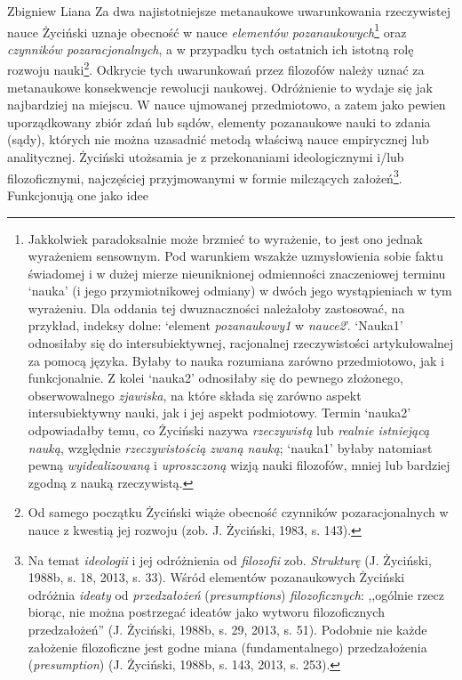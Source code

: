 \begin{artplenv}{Zbigniew Liana}
Za dwa najistotniejsze metanaukowe uwarunkowania rzeczywistej nauce Życiński uznaje obecność w nauce \textit{elementów
pozanaukowych}\footnote{Jakkolwiek paradoksalnie może brzmieć to wyrażenie, to jest ono jednak wyrażeniem sensownym.
Pod warunkiem wszakże uzmysłowienia sobie faktu świadomej i w dużej mierze nieuniknionej odmienności znaczeniowej
terminu `nauka' (i jego przymiotnikowej odmiany) w dwóch jego wystąpieniach w tym wyrażeniu. Dla oddania tej
dwuznaczności należałoby zastosować, na przykład, indeksy dolne: `element \textit{pozanaukowy1} w \textit{nauce2}'.
`Nauka1' odnosiłaby się do intersubiektywnej, racjonalnej rzeczywistości artykułowalnej za pomocą języka. Byłaby to
nauka rozumiana zarówno przedmiotowo, jak i funkcjonalnie. Z kolei `nauka2' odnosiłaby się do pewnego złożonego,
obserwowalnego \textit{zjawiska}, na które składa się zarówno aspekt intersubiektywny nauki, jak i jej aspekt podmiotowy.
Termin `nauka2' odpowiadałby temu, co Życiński nazywa \textit{rzeczywistą }lub\textit{ realnie istniejącą nauką}, względnie
\textit{rzeczywistością zwaną nauką}; `nauka1' byłaby natomiast pewną \textit{wyidealizowaną} i \textit{uproszczoną }wizją
nauki filozofów, mniej lub bardziej zgodną z nauką rzeczywistą.} oraz
\textit{czynników pozaracjonalnych}, a w przypadku
tych ostatnich ich istotną rolę rozwoju nauki\footnote{Od samego początku Życiński wiąże obecność czynników
pozaracjonalnych w nauce z kwestią jej rozwoju \label{ref:RNDGwyI8mc6od}(zob. J. Życiński, 1983, s. 143).}. Odkrycie
tych uwarunkowań przez filozofów należy uznać za metanaukowe konsekwencje rewolucji naukowej. Odróżnienie to wydaje się
jak najbardziej na miejscu. W nauce ujmowanej przedmiotowo, a zatem jako pewien uporządkowany zbiór zdań lub sądów,
elementy pozanaukowe nauki to zdania (sądy), których nie można uzasadnić metodą właściwą nauce empirycznej lub
analitycznej. Życiński utożsamia je z przekonaniami ideologicznymi i/lub filozoficznymi, najczęściej przyjmowanymi w formie
milczących założeń\footnote{Na temat \textit{ideologii} i jej odróżnienia od \textit{filozofii} zob.
\textit{Strukturę} \label{ref:RND65JRx0WUvQ}(J. Życiński, 1988b, s. 18, 2013, s. 33). Wśród elementów pozanaukowych
Życiński odróżnia \textit{ideaty} od \textit{przedzałożeń} (\textit{presumptions}) \textit{filozoficznych}: ,,ogólnie rzecz
biorąc, nie można postrzegać ideatów jako wytworu filozoficznych przedzałożeń'' \label{ref:RNDNBJ2x09ZUn}(J. Życiński,
1988b, s. 29, 2013, s. 51). Podobnie nie każde założenie filozoficzne jest godne miana (fundamentalnego) przedzałożenia
(\textit{presumption}) \label{ref:RNDKgGZVRdQ4Q}(J. Życiński, 1988b, s. 143, 2013, s. 253).}. Funkcjonują one jako idee

\end{artplenv}
